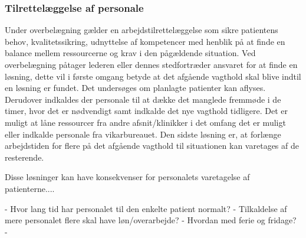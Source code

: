 \subsubsection{Tilrettelæggelse af personale}
Under overbelægning gælder en arbejdstilrettelæggelse som sikre patientens behov, kvalitetssikring, udnyttelse af kompetencer med henblik på at finde en balance mellem ressourcerne og krav i den pågældende situation. Ved overbelægning påtager lederen eller dennes stedfortræder ansvaret for at finde en løsning, dette vil i første omgang betyde at det afgående vagthold skal blive indtil en løsning er fundet. Det undersøges om planlagte patienter kan aflyses. Derudover indkaldes der personale til at dække det manglede fremmøde i de timer, hvor det er nødvendigt samt indkalde det nye vagthold tidligere. Det er muligt at låne ressourcer fra andre afsnit/klinikker i det omfang det er muligt eller indkalde personale fra vikarbureauet. Den sidste løsning er, at forlænge arbejdstiden for flere på det afgående vagthold til situationen kan varetages af de resterende. \cite{Bjerg2016}

Disse løsninger kan have konsekvenser for personalets varetagelse af patienterne.... \cite{KILDE- }

- Hvor lang tid har personalet til den enkelte patient normalt?
- Tilkaldelse af mere personalet flere skal have løn/overarbejde?
- Hvordan med ferie og fridage?
- 

